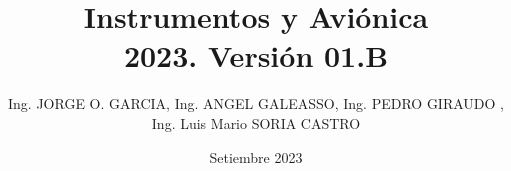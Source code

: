 \documentclass[a4page,12pt,twoside, spanish]{book}
\title{Instrumentos y Avi\'onica \\ 2023. Versi\'on 01.B}
\author{Ing. JORGE O. GARCIA, Ing. ANGEL GALEASSO, Ing. PEDRO GIRAUDO , Ing. Luis Mario SORIA CASTRO}
\date{Setiembre 2023}
\begin{document}
\renewcommand{\listtablename}{\'Indice de tablas} 
\renewcommand{\tablename}{Tabla}  %

\renewcommand{\appendixtocname}{Ap\'endices}
\renewcommand{\appendixpagename}{Ap\'endices}

\renewcommand{\baselinestretch}{1.5}       %

\setlength{\parindent}{0pt}      %

\clearpage
\thispagestyle{fancy}

\maketitle

\tableofcontents





















\clearpage	%
\printacronyms[name = Acr\'onimos, heading = chapter*]


\clearpage
\printglossaries	%

\clearpage


\clearpage
\renewcommand\bibname{Bibliograf\'ia} %



%


%
%

\begin{appendices}

%
%

\end{appendices}
\end{document}
